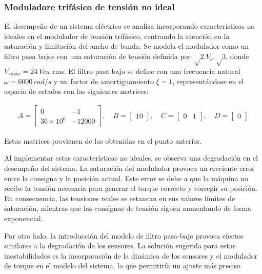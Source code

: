 \documentclass{article}
\begin{document}

\subsubsection{Moduladore trifásico de tensión no ideal}

El desempeño de un sistema eléctrico se analiza incorporando características no ideales en el 
modulador de tensión trifásico, centrando la atención en la saturación y limitación del ancho de 
banda. Se modela el modulador como un filtro pasa bajos con una saturación de tensión definida por 
$√2.V_s.√3$, donde $V_{smáx} = 24\,Vca$ rms. El filtro pasa bajo se define con una frecuencia 
natural $\omega = 6000\,rad/s$ y un factor de amortiguamiento $\xi = 1$, representándose en el 
espacio de estados con las siguientes matrices: 

    \begin{align*}
    A = \begin{bmatrix}
    0 & -1 \\
    36 \times 10^6 & -12000
    \end{bmatrix}, \quad
    B = \begin{bmatrix}
    10
    \end{bmatrix}, \quad
    C = \begin{bmatrix}
    0 & 1
    \end{bmatrix}, \quad
    D = \begin{bmatrix}
    0
    \end{bmatrix}
\end{align*}

Estas matrices provienen de las obtenidas en el punto anterior. 

Al implementar estas características no ideales, se observa una degradación en el desempeño 
del sistema. La saturación del modulador provoca un creciente error entre la consigna y la
posición actual. Este error se debe a que la máquina no recibe la tensión necesaria para generar 
el torque correcto y corregir su posición. En consecuencia, las tensiones reales se estancan en 
sus valores límites de saturación, mientras que las consignas de tensión siguen aumentando de 
forma exponencial. 

Por otro lado, la introducción del modelo de filtro pasa-bajo provoca efectos 
similares a la degradación de los sensores. La solución sugerida para estas inestabilidades es la 
incorporación de la dinámica de los sensores y el modulador de torque en el modelo del sistema, 
lo que permitiría un ajuste más preciso
\end{document}
